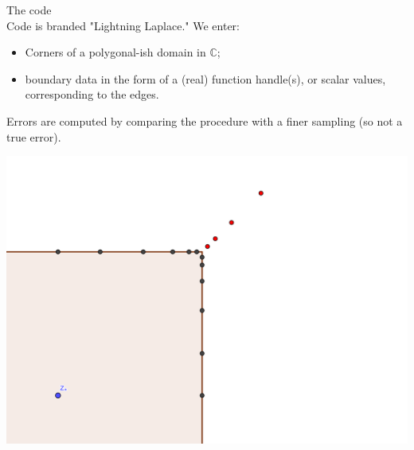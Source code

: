 \documentclass{seminar}
\begin{document}
\begin{slide} %
\large The code \\
\small
Code is branded "Lightning Laplace." We enter:
\begin{itemize}
	\item Corners of a polygonal-ish domain in $\mathds{C}$;
	\item boundary data in the form of a (real) function handle(s), or scalar values, corresponding to the edges.
\end{itemize}
Errors are computed by comparing the procedure with a finer sampling (so not a true error).\\
\begin{center}
\includegraphics[scale=4]{./PNG/corner_nodes_illust}
\end{center}
\end{slide} %




\begin{slide} %

\end{slide} %
\end{document}
